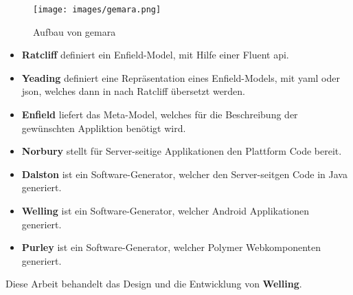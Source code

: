 \begin{figure}[H]
	\begin{center}
		\texttt{[image: images/gemara.png]}
		\caption{Aufbau von \acs{gemara}}
		\label{fig:gemara}
	\end{center}
\end{figure}

\begin{itemize}
	\item \textbf{Ratcliff} definiert ein Enfield-Model, mit Hilfe einer Fluent \acs{api}.
	\item \textbf{Yeading} definiert eine Repräsentation eines Enfield-Models, mit \acf{yaml} oder \acf{json}, welches dann in nach Ratcliff übersetzt werden.
	\item \textbf{Enfield} liefert das Meta-Model, welches für die Beschreibung der gewünschten Appliktion benötigt wird.
	\item \textbf{Norbury} stellt für Server-seitige Applikationen den Plattform Code bereit.
	\item \textbf{Dalston} ist ein Software-Generator, welcher den Server-seitgen Code in Java generiert.
	\item \textbf{Welling} ist ein Software-Generator, welcher Android Applikationen generiert.
	\item \textbf{Purley} ist ein Software-Generator, welcher Polymer Webkomponenten generiert. 
\end{itemize}

Diese Arbeit behandelt das Design und die Entwicklung von \textbf{Welling}.